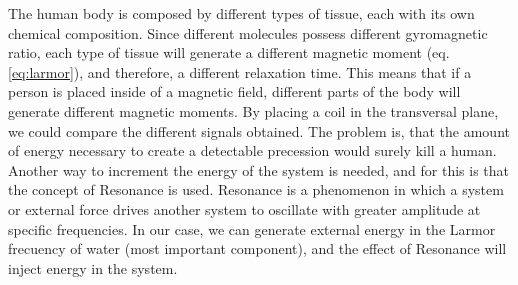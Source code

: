 The human body is composed by different types of tissue, each with its own chemical composition.
Since different molecules possess different gyromagnetic ratio, each type of tissue will generate a different magnetic moment (eq. \ref{eq:larmor}), and therefore, a different relaxation time.
This means that if a person is placed inside of a magnetic field, different parts of the body will generate different magnetic moments.
By placing a coil in the transversal plane, we could compare the different signals obtained.
The problem is, that the amount of energy necessary to create a detectable precession would surely kill a human.
Another way to increment the energy of the system is needed, and for this is that the concept of Resonance is used.
Resonance is a phenomenon in which a system or external force drives another system to oscillate with greater amplitude at specific frequencies.
In our case, we can generate external energy in the Larmor frecuency of water (most important component), and the effect of Resonance will inject energy in the system.

